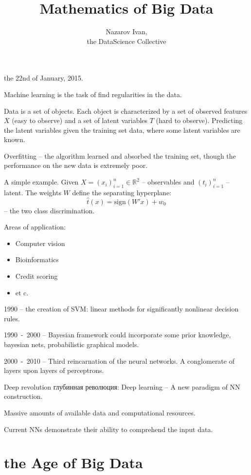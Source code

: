 \documentclass[a4paper]{article}
\title{Mathematics of Big Data}
\author{Nazarov Ivan, \rus{101мНОД(ИССА)}\\the DataScience Collective}
\newcommand{\brac}[1]{{\left ( #1 \right )}}
\newcommand{\Real}{\mathbb{R}}
\newcommand{\rus}[1]{\foreignlanguage{russian}{#1}}
\begin{document}
\maketitle

the 22nd of January, 2015.


Machine learning is the task of find regularities in the data.

Data is a set of objects.
Each object is characterized by a set of observed features $X$ (easy to observe)
and a set of latent variables $T$ (hard to observe).
Predicting the latent variables given the training set data, where some latent variables are known.

Overfitting -- the algorithm learned and absorbed the training set, though the performance on the new data is extremely poor.

A simple example.
Given $X = \brac{x_i}_{i=1}^n\in \Real^2$ -- observables and $\brac{t_i}_{i=1}^n$ -- latent. The weights $W$ define the separating hyperplane:
\[\hat{t}(x) = \text{sign}\brac{W'x} + w_0\]
-- the two class discrimination.

Areas of application:
\begin{itemize}
	\item Computer vision
	\item Bioinformatics
	\item Credit scoring
	\item et c.	
\end{itemize}


1990 -- the creation of SVM: linear methods for significantly nonlinear decision rules.

1990~-~2000 -- Bayesian framework could incorporate some prior knowledge, bayesian nets, probabilistic graphical models.


2000~-~2010 -- Third reincarnation of the neural networks.
A conglomerate of layers upon layers of perceptrons.

Deep revolution \rus{глубинная революция}:
Deep learning -- A new paradigm of NN construction.

Massive amounts of available data and computational resources.

Current NNs demonstrate their ability to comprehend the input data.

\section{the Age of Big Data} %
\label{sec:the_age_of_big_data}
\end{document}
